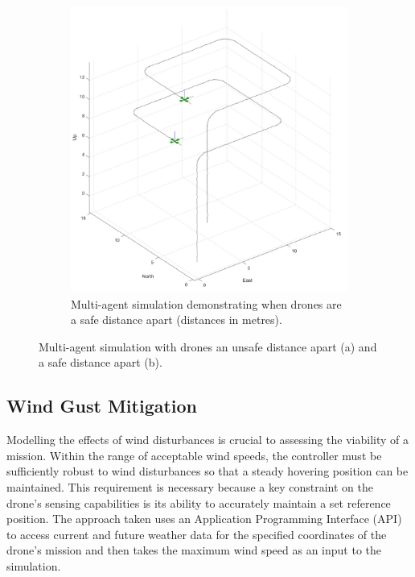 \begin{figure}[H]
\begin{subfigure}[b]{0.48\textwidth}
        \includegraphics[width=\textwidth]{figs/Samuel/Figures/MultiAgentExampleGreen (2).pdf}
        \caption{Multi-agent simulation demonstrating when drones are a safe distance apart (distances in metres).}
        \label{fig:1b}
    \end{subfigure}
    \caption[Multi-agent Simulation]{Multi-agent simulation with drones an unsafe distance apart (a) and a safe distance apart (b).}
    \label{fig:dronemulti}
\end{figure}



\subsection{Wind Gust Mitigation}
\label{gust}
Modelling the effects of wind disturbances is crucial to assessing the viability of a mission. Within the range of acceptable wind speeds, the controller must be sufficiently robust to wind disturbances so that a steady hovering position can be maintained. This requirement is necessary because a key constraint on the drone's sensing capabilities is its ability to accurately maintain a set reference position. The approach taken uses an Application Programming Interface (API) to access current and future weather data for the specified coordinates of the drone's mission and then takes the maximum wind speed as an input to the simulation. 

